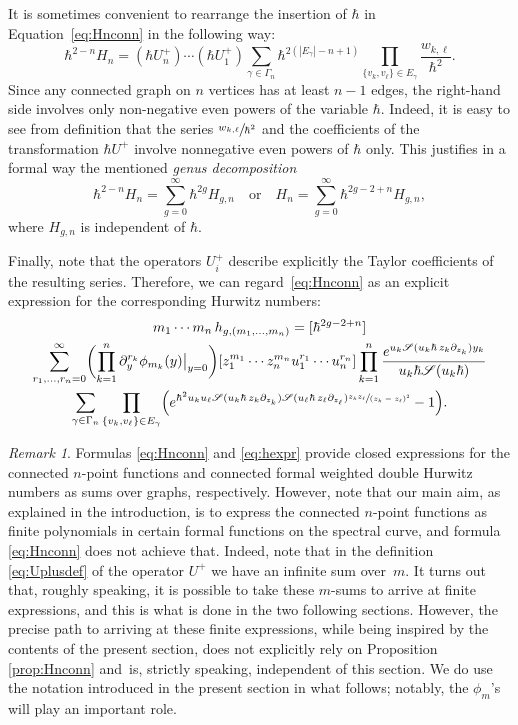 \documentclass[JEP,XML,SOM,Unicode,NoEqCountersInSection,NoFloatCountersInSection]{cedram}
\let\mathcal\mathscr
\theoremstyle{plain}
\theoremstyle{definition}
\theoremstyle{remark}
\newtheorem{remark}[theorem]{Remark}
\newcommand{\cS}{\mathcal{S}}
\newcommand{\Hc}{H}
\begin{document}
It is sometimes convenient to rearrange the insertion of $\hbar$ in Equation~\eqref{eq:Hnconn} in the following way:
\begin{equation*}
\hbar^{2-n}H_n=
(\hbar U^+_n)\cdots(\hbar U^+_1)
\sum_{\gamma \in \Gamma_n}\hbar^{2(|E_\gamma|-n+1)}\prod_{\{v_k,v_\ell\}\in E_\gamma}
\frac{w_{k,\ell}}{\hbar^2}.
\end{equation*}
Since any connected graph on $n$ vertices has at least $n-1$ edges, the right-hand side involves only non-negative even powers of the variable $\hbar$. Indeed, it is easy to see from definition that the series $\sfrac{w_{k,\ell}}{\hbar^2}$ and the coefficients of the transformation $\hbar U^+$ involve nonnegative even powers of $\hbar$ only. This justifies in a formal way the mentioned \emph{genus decomposition}
\begin{equation*}\label{eq:Hgndef}
\hbar^{2-n}\Hc_n=\sum_{g=0}^\infty\hbar^{2g}\Hc_{g,n}
\quad\text{or}\quad
\Hc_n=\sum_{g=0}^\infty\hbar^{2g-2+n}\Hc_{g,n},
\end{equation*}
where $\Hc_{g,n}$ is independent of $\hbar$.

Finally, note that the operators $U^+_i$ describe explicitly the Taylor coefficients of the resulting series. Therefore, we can regard~\eqref{eq:Hnconn} as an explicit expression for the corresponding Hurwitz numbers:
\begin{multline}\label{eq:hexpr}
m_1\cdots m_n\,h_{g,(m_1,\dots,m_n)}
=[\hbar^{2g-2+n}]\\
\sum_{r_1,\dots,r_n=0}^\infty
\biggl(\prod_{k=1}^n\partial_y^{r_k}\phi_{m_k}(y)\big|_{y=0}\biggr) [z_1^{m_1}\cdots z_n^{m_n}u_1^{r_1}\cdots u_n^{r_n}]
\prod_{k=1}^n \frac{e^{ u_k\cS(u_k\hbar\,z_k\partial_{z_k})y_k }}
{u_k\hbar\cS(u_k\hbar)}\\
\sum_{\gamma\in\Gamma_n} \prod_{\{v_k,v_\ell\}\in E_\gamma}
\Bigl(e^{\hbar^2u_ku_\ell\cS(u_k\hbar\,z_k\partial_{z_k})\cS(u_\ell\hbar\,z_\ell\partial_{z_\ell})
\sfrac{z_k z_\ell}{(z_k-z_\ell)^2}}-1\Bigr).
\end{multline}

\begin{remark}
Formulas \eqref{eq:Hnconn} and \eqref{eq:hexpr} provide closed expressions for the connected $n$-point functions and connected formal weighted double Hurwitz numbers as sums over graphs, respectively. However, note that our main aim, as explained in the introduction, is to express the connected $n$-point functions as finite polynomials in certain formal functions on the spectral curve, and formula \eqref{eq:Hnconn} does not achieve that. Indeed, note that in the definition \eqref{eq:Uplusdef} of the operator $U^+$ we have an infinite sum over~$m$. It turns out that, roughly speaking, it is possible to
take these $m$-sums to arrive at finite expressions, and this is what is done in the two following sections. However, the precise path to arriving at these finite expressions, while being inspired by the contents of the present section, does not explicitly rely on Proposition \ref{prop:Hnconn} and~is, strictly speaking, independent of this section. We do use the notation introduced in the present section in what follows; notably, the $\phi_m$'s will play an important role.
\end{remark}
\end{document}
